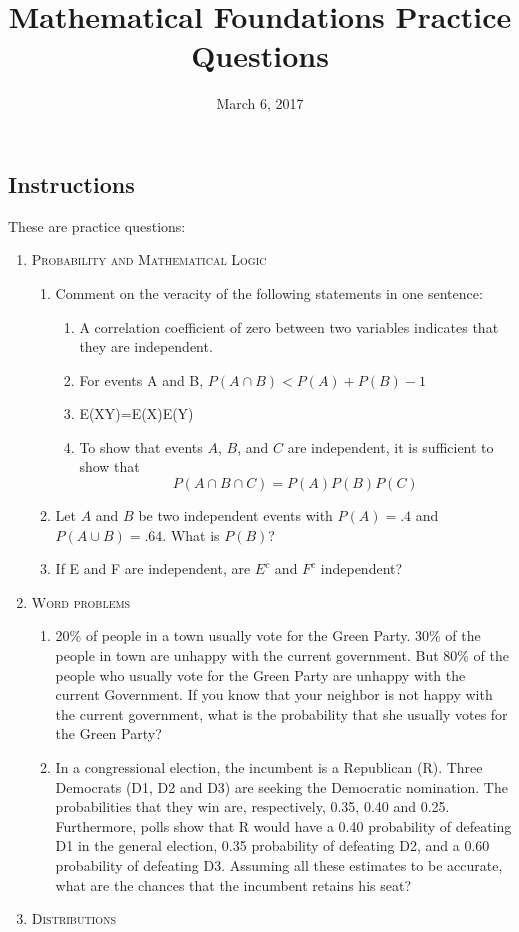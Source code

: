 \documentclass[11pt,letterpaper]{article}
\title{Mathematical Foundations Practice Questions}
\date{March 6, 2017}
\numberwithin{equation}{section}
\begin{document}
\maketitle
\subsection*{Instructions}
These are practice questions:
\begin{enumerate}[I]
\item \textsc{Probability and Mathematical Logic }
\begin{enumerate}[1)]
\item Comment on the veracity of the following statements in one sentence:
\begin{enumerate}
\item A correlation coefficient of zero between two variables indicates that they are independent.
\item For events A and B, $P(A\cap B) < P(A)+P(B)-1$
\item E(XY)=E(X)E(Y)
\item To show that events $A$, $B$, and $C$ are independent, it is sufficient to show that $$P(A\cap B \cap C)=P(A)P(B)P(C)$$
\end{enumerate}

\item Let $A$ and $B$ be two independent events with $P(A)= .4$ and $P(A\cup B)=.64$.  What is $P(B)$?
\item  If E and F are independent, are $E^c$ and $F^c$ independent?

\end{enumerate}
\pagebreak
\item \textsc{Word problems}  
\begin{enumerate}
\item 20\% of people in a town usually vote for the Green Party. 30\% of the people in town are unhappy with the current government. But 80\% of the people who usually vote for the Green Party are unhappy with the current Government. If you know that your neighbor is not happy with the current government, what is the probability that she usually votes for the Green Party?

\item In a congressional election, the incumbent is a Republican (R). Three Democrats (D1, D2 and D3) are seeking the Democratic nomination. The probabilities that they win are, respectively, 0.35, 0.40 and 0.25. Furthermore, polls show that R would have a 0.40 probability of defeating D1 in the general election, 0.35 probability of defeating D2, and a 0.60 probability of defeating D3. Assuming all these estimates to be accurate, what are the chances that the incumbent retains his seat?
\end{enumerate}
\item \textsc{Distributions} 
\begin{enumerate}


\end{enumerate}
\end{enumerate}
\end{document}

